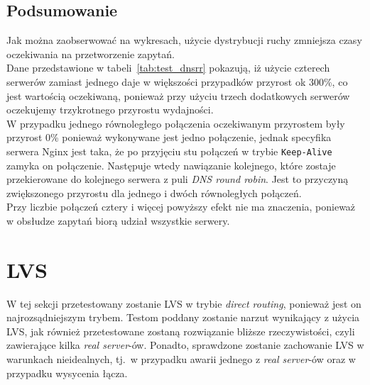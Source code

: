 \subsection{Podsumowanie}
Jak można zaobserwować na wykresach, użycie dystrybucji ruchy zmniejsza czasy oczekiwania na przetworzenie zapytań.\\
Dane przedstawione w tabeli~\ref{tab:test_dnsrr} pokazują, iż użycie czterech serwerów zamiast jednego daje w większości przypadków przyrost ok 300\%, co jest wartością oczekiwaną, ponieważ przy użyciu trzech dodatkowych serwerów oczekujemy trzykrotnego przyrostu wydajności.\\
W przypadku jednego równoległego połączenia oczekiwanym przyrostem były przyrost 0\% ponieważ wykonywane jest jedno połączenie, jednak specyfika serwera Nginx jest taka, że po przyjęciu stu połączeń w trybie \texttt{Keep-Alive} zamyka on połączenie.
Następuje wtedy nawiązanie kolejnego, które zostaje przekierowane do kolejnego serwera z puli \textit{DNS round robin}.
Jest to przyczyną zwiększonego przyrostu dla jednego i dwóch równoległych połączeń.\\
Przy liczbie połączeń cztery i więcej powyższy efekt nie ma znaczenia, ponieważ w obsłudze zapytań biorą udział wszystkie serwery.
\section{LVS}
W tej sekcji przetestowany zostanie LVS w trybie \textit{direct routing}, ponieważ jest on najrozsądniejszym trybem.
Testom poddany zostanie narzut wynikający z użycia LVS, jak również przetestowane zostaną rozwiązanie bliższe rzeczywistości, czyli zawierające kilka \textit{real server}-ów.
Ponadto, sprawdzone zostanie zachowanie LVS w warunkach nieidealnych, tj.\ w przypadku awarii jednego z \textit{real server}-ów oraz w przypadku wysycenia łącza.
